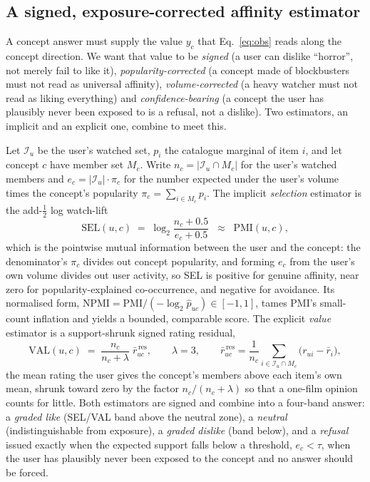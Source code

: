 \documentclass[manuscript,screen]{acmart}
\begin{document}
\subsection{A signed, exposure-corrected affinity estimator}\label{sec:concept:est}

A concept answer must supply the value $y_c$ that Eq.~\eqref{eq:obs} reads along the concept direction. We want that value to be \emph{signed} (a user can dislike ``horror'', not merely fail to like it), \emph{popularity-corrected} (a concept made of blockbusters must not read as universal affinity), \emph{volume-corrected} (a heavy watcher must not read as liking everything) and \emph{confidence-bearing} (a concept the user has plausibly never been exposed to is a refusal, not a dislike). Two estimators, an implicit and an explicit one, combine to meet this.

Let $\mathcal I_u$ be the user's watched set, $p_i$ the catalogue marginal of item $i$, and let concept $c$ have member set $M_c$. Write $n_c=|\mathcal I_u\cap M_c|$ for the user's watched members and $e_c=|\mathcal I_u|\cdot\pi_c$ for the number expected under the user's volume times the concept's popularity $\pi_c=\sum_{i\in M_c}p_i$. The implicit \emph{selection} estimator is the add-$\tfrac12$ log watch-lift
\begin{equation}\label{eq:sel}
  \mathrm{SEL}(u,c) \;=\; \log_2\frac{n_c+0.5}{e_c+0.5}
  \;\;\approx\;\; \mathrm{PMI}(u,c),
\end{equation}
which is the pointwise mutual information between the user and the concept: the denominator's $\pi_c$ divides out concept popularity, and forming $e_c$ from the user's own volume divides out user activity, so SEL is positive for genuine affinity, near zero for popularity-explained co-occurrence, and negative for avoidance. Its normalised form, $\mathrm{NPMI}=\mathrm{PMI}/(-\log_2 \hat p_{uc})\in[-1,1]$, tames PMI's small-count inflation and yields a bounded, comparable score. The explicit \emph{value} estimator is a support-shrunk signed rating residual,
\begin{equation}\label{eq:val}
  \mathrm{VAL}(u,c) \;=\; \frac{n_c}{n_c+\lambda}\;\bar r^{\,\mathrm{res}}_{uc},
  \qquad \lambda=3,\qquad
  \bar r^{\,\mathrm{res}}_{uc}=\frac{1}{n_c}\!\!\sum_{i\in\mathcal I_u\cap M_c}\!\!\bigl(r_{ui}-\bar r_i\bigr),
\end{equation}
the mean rating the user gives the concept's members above each item's own mean, shrunk toward zero by the factor $n_c/(n_c+\lambda)$ so that a one-film opinion counts for little. Both estimators are signed and combine into a four-band answer: a \emph{graded like} (SEL/VAL band above the neutral zone), a \emph{neutral} (indistinguishable from exposure), a \emph{graded dislike} (band below), and a \emph{refusal} issued exactly when the expected support falls below a threshold, $e_c<\tau$, when the user has plausibly never been exposed to the concept and no answer should be forced.
\end{document}
